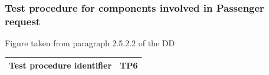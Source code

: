 \documentclass[a4paper,11pt]{report} %
\begin{document}
			\subsubsection{Test procedure for components involved in Passenger request}
				\begin{minipage}{\linewidth}
				\end{minipage}
				\begin{center}
					Figure taken from paragraph 2.5.2.2 of the DD
				\end{center} 			
				\begin{center}
					\begin{tabular}{| l | p{10cm} |}\hline
						\textbf{Test procedure identifier} & TP6\\\hline
					\end{tabular}
				\end{center}			
		\pagebreak				
\end{document}
